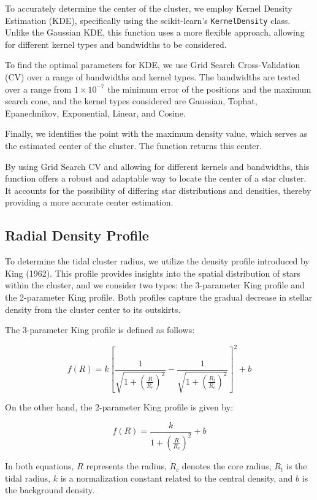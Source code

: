 \documentclass[fleqn,usenatbib,usedcolumn,useAMS]{mnras}
\begin{document}
To accurately determine the center of the cluster, we employ Kernel Density Estimation (KDE), specifically using the scikit-learn's \texttt{KernelDensity} class. Unlike the Gaussian KDE, this function uses a more flexible approach, allowing for different kernel types and bandwidths to be considered.

To find the optimal parameters for KDE, we use Grid Search Cross-Validation (CV) over a range of bandwidths and kernel types. The bandwidths are tested over a range from \(1 \times 10^{-7}\) the minimum error of the positions and the maximum search cone, and the kernel types considered are Gaussian, Tophat, Epanechnikov, Exponential, Linear, and Cosine.

Finally, we identifies the point with the maximum density value, which serves as the estimated center of the cluster. The function returns this center.

By using Grid Search CV and allowing for different kernels and bandwidths, this function offers a robust and adaptable way to locate the center of a star cluster. It accounts for the possibility of differing star distributions and densities, thereby providing a more accurate center estimation.

\subsection{Radial Density Profile}
To determine the tidal cluster radius, we utilize the density profile introduced by King (1962). This profile provides insights into the spatial distribution of stars within the cluster, and we consider two types: the 3-parameter King profile and the 2-parameter King profile. Both profiles capture the gradual decrease in stellar density from the cluster center to its outskirts.

The 3-parameter King profile is defined as follows:

\begin{equation}
f(R) = k \left[\frac{1}{\sqrt{1 + \left(\frac{R}{R_c}\right)^2}} - \frac{1}{\sqrt{1 + \left(\frac{R_t}{R_c}\right)^2}}\right]^2 + b
\end{equation}

On the other hand, the 2-parameter King profile is given by:

\begin{equation}
f(R) = \frac{k}{1 + \left(\frac{R}{R_c}\right)^2} + b
\end{equation}

In both equations, $R$ represents the radius, $R_c$ denotes the core radius, $R_t$ is the tidal radius, $k$ is a normalization constant related to the central density, and $b$ is the background density.
\end{document}
